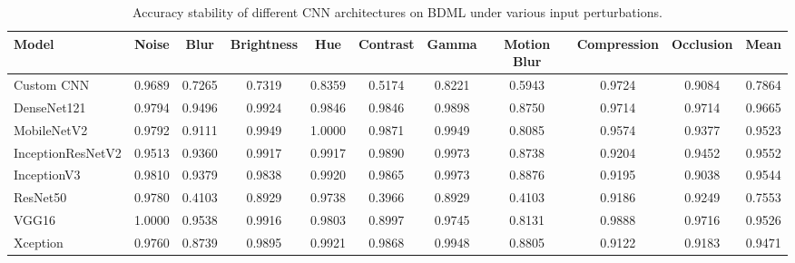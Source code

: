 \documentclass[a4paper,fleqn]{cas-dc}
\begin{document}
\begin{table}[t]
\centering
\caption{Accuracy stability of different CNN architectures on BDML under various input perturbations.}
\label{tab:accuracy_stability_bdmedileaves}

\scriptsize
\setlength{\tabcolsep}{3pt}
\renewcommand{\arraystretch}{1.1}

\begin{tabular}{|l|ccccccccc|c|}
\hline
\textbf{Model} &
\textbf{Noise} &
\textbf{Blur} &
\textbf{Brightness} &
\textbf{Hue} &
\textbf{Contrast} &
\textbf{Gamma} &
\textbf{Motion Blur} &
\textbf{Compression} &
\textbf{Occlusion} &
\textbf{Mean} \\
\hline

Custom CNN
&0.9689&0.7265&0.7319&0.8359&0.5174&0.8221&0.5943&0.9724&0.9084&0.7864\\

DenseNet121
&0.9794&0.9496&0.9924&0.9846&0.9846&0.9898&0.8750&0.9714&0.9714&0.9665\\

MobileNetV2
&0.9792&0.9111&0.9949&1.0000&0.9871&0.9949&0.8085&0.9574&0.9377&0.9523\\

InceptionResNetV2
&0.9513&0.9360&0.9917&0.9917&0.9890&0.9973&0.8738&0.9204&0.9452&0.9552\\

InceptionV3
&0.9810&0.9379&0.9838&0.9920&0.9865&0.9973&0.8876&0.9195&0.9038&0.9544\\

ResNet50
&0.9780&0.4103&0.8929&0.9738&0.3966&0.8929&0.4103&0.9186&0.9249&0.7553\\

VGG16
&1.0000&0.9538&0.9916&0.9803&0.8997&0.9745&0.8131&0.9888&0.9716&0.9526\\

Xception
&0.9760&0.8739&0.9895&0.9921&0.9868&0.9948&0.8805&0.9122&0.9183&0.9471\\

\hline
\end{tabular}
\end{table}
\end{document}
